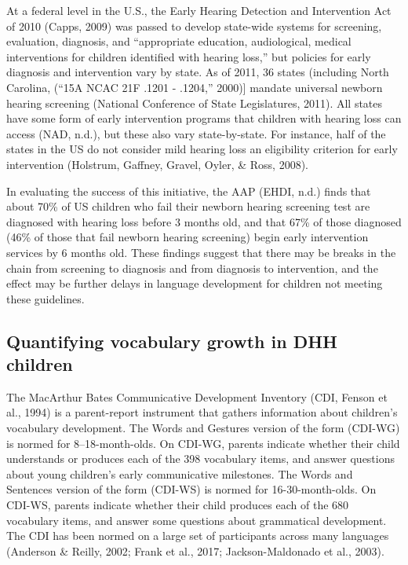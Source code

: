 \documentclass[english,man]{apa6}
\begin{document}
At a federal level in the U.S., the Early Hearing Detection and Intervention Act of 2010 (Capps, 2009) was passed to develop state-wide systems for screening, evaluation, diagnosis, and \enquote{appropriate education, audiological, medical interventions for children identified with hearing loss,} but policies for early diagnosis and intervention vary by state. As of 2011, 36 states (including North Carolina, (``15A NCAC 21F .1201 - .1204,'' 2000){]} mandate universal newborn hearing screening (National Conference of State Legislatures, 2011). All states have some form of early intervention programs that children with hearing loss can access (NAD, n.d.), but these also vary state-by-state. For instance, half of the states in the US do not consider mild hearing loss an eligibility criterion for early intervention (Holstrum, Gaffney, Gravel, Oyler, \& Ross, 2008).

In evaluating the success of this initiative, the AAP (EHDI, n.d.) finds that about 70\% of US children who fail their newborn hearing screening test are diagnosed with hearing loss before 3 months old, and that 67\% of those diagnosed (46\% of those that fail newborn hearing screening) begin early intervention services by 6 months old. These findings suggest that there may be breaks in the chain from screening to diagnosis and from diagnosis to intervention, and the effect may be further delays in language development for children not meeting these guidelines.

\hypertarget{quantifying-vocabulary-growth-in-dhh-children}{%
\subsection{Quantifying vocabulary growth in DHH children}\label{quantifying-vocabulary-growth-in-dhh-children}}

The MacArthur Bates Communicative Development Inventory (CDI, Fenson et al., 1994) is a parent-report instrument that gathers information about children's vocabulary development. The Words and Gestures version of the form (CDI-WG) is normed for 8--18-month-olds. On CDI-WG, parents indicate whether their child understands or produces each of the 398 vocabulary items, and answer questions about young children's early communicative milestones. The Words and Sentences version of the form (CDI-WS) is normed for 16-30-month-olds. On CDI-WS, parents indicate whether their child produces each of the 680 vocabulary items, and answer some questions about grammatical development. The CDI has been normed on a large set of participants across many languages (Anderson \& Reilly, 2002; Frank et al., 2017; Jackson-Maldonado et al., 2003).
\end{document}
